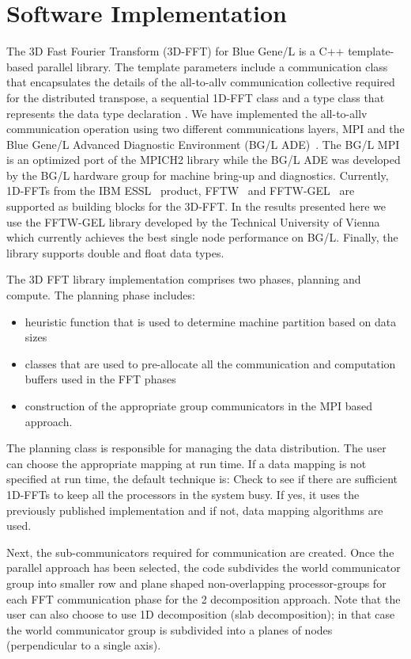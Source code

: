 
\section{Software Implementation}
\label{sec:software}
The 3D Fast Fourier Transform (3D-FFT) for Blue Gene/L is a C++ template-based parallel
library. The template parameters include a communication class
that encapsulates the details of the all-to-allv communication collective
required for the distributed transpose, a sequential 1D-FFT class and a  type class that represents 
the data type declaration .
 We have implemented the all-to-allv communication operation using two
different communications layers, MPI and the Blue Gene/L Advanced
Diagnostic Environment (BG/L ADE)~\cite{giampapa:2005}. The BG/L MPI is an
optimized port of the MPICH2 library while the BG/L ADE was developed
by the BG/L hardware group for machine bring-up and diagnostics.
Currently, 1D-FFTs  from the IBM ESSL~\cite{ESSL_BGL}
product, FFTW~\cite{FrJo98} and FFTW-GEL~\cite{lorenz:2005} are
supported as building blocks for the 3D-FFT. In the
results presented here we use the FFTW-GEL library developed by
the Technical University of Vienna which currently achieves the best
single node performance on BG/L. Finally, the library supports double and float 
data types. 

The 3D FFT library implementation comprises two phases, planning and compute.
The planning phase includes:
\begin{itemize}
\item{ heuristic function that is used to determine machine partition
    based on data sizes}
\item{ classes that are used to pre-allocate all the communication and
    computation buffers used in the FFT phases}
\item{ construction of the appropriate group communicators in the MPI
    based approach.}
\end{itemize}

The planning class is responsible for managing the data distribution.
The user can choose the appropriate mapping at run time. If
a data mapping is not specified at run time, the
default technique is:  Check to see if there are
sufficient 1D-FFTs to keep all the processors in the
system busy.  If yes, it uses the previously published implementation and
if not, data mapping algorithms are used.

Next, the sub-communicators required for communication are created.
Once the parallel approach has been selected, the
code subdivides the world communicator group into smaller row and plane shaped
non-overlapping processor-groups for each FFT communication phase for the
2 decomposition approach. Note that 
the user can also choose to use 1D decomposition (slab decomposition); in that 
case the world communicator group is subdivided into a planes of nodes
(perpendicular to a single axis).

